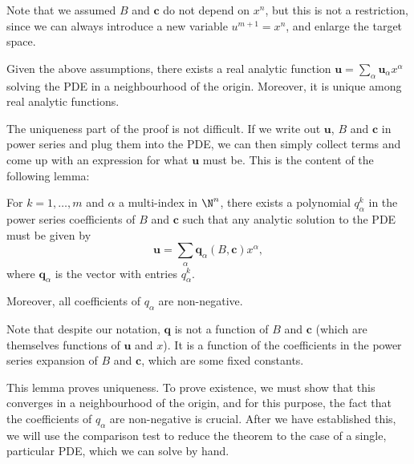\documentclass[a4paper]{article}
\begin{document}
Note that we assumed $B$ and $\mathbf{c}$ do not depend on $x^n$, but this is not a restriction, since we can always introduce a new variable $u^{m + 1} = x^n$, and enlarge the target space.

\begin{thm}
  Given the above assumptions, there exists a real analytic function $\mathbf{u} = \sum_\alpha \mathbf{u}_\alpha x^\alpha$ solving the PDE in a neighbourhood of the origin. Moreover, it is unique among real analytic functions.
\end{thm}

The uniqueness part of the proof is not difficult. If we write out $\mathbf{u}$, $B$ and $\mathbf{c}$ in power series and plug them into the PDE, we can then simply collect terms and come up with an expression for what $\mathbf{u}$ must be. This is the content of the following lemma:

\begin{lemma}
  For $k = 1, \ldots, m$ and $\alpha$ a multi-index in $\N^n$, there exists a polynomial $q_\alpha^k$ in the power series coefficients of $B$ and $\mathbf{c}$ such that any analytic solution to the PDE must be given by
  \[
    \mathbf{u} = \sum_{\alpha} \mathbf{q}_\alpha(B, \mathbf{c}) x^\alpha,
  \]
  where $\mathbf{q}_\alpha$ is the vector with entries $q_\alpha^k$.

  Moreover, all coefficients of $q_\alpha$ are non-negative.
\end{lemma}
Note that despite our notation, $\mathbf{q}$ is not a function of $B$ and $\mathbf{c}$ (which are themselves functions of $\mathbf{u}$ and $x$). It is a function of the coefficients in the power series expansion of $B$ and $\mathbf{c}$, which are some fixed constants.

This lemma proves uniqueness. To prove existence, we must show that this converges in a neighbourhood of the origin, and for this purpose, the fact that the coefficients of $q_\alpha$ are non-negative is crucial. After we have established this, we will use the comparison test to reduce the theorem to the case of a single, particular PDE, which we can solve by hand.
\end{document}
